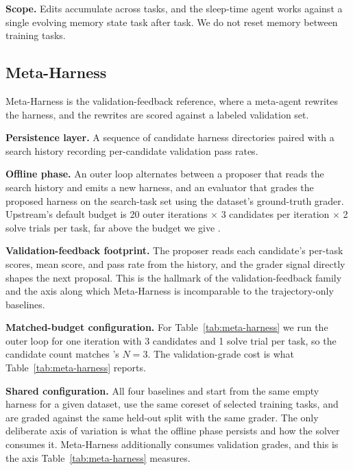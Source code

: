 \noindent\textbf{Scope.}
Edits accumulate across tasks, and the sleep-time agent works against a single evolving memory state task after task.
We do not reset memory between training tasks.

\subsection{Meta-Harness \citep{lee2026metaharness}}

Meta-Harness is the validation-feedback reference, where a meta-agent rewrites the harness, and the rewrites are scored against a labeled validation set.

\noindent\textbf{Persistence layer.}
A sequence of candidate harness directories paired with a search history recording per-candidate validation pass rates.

\noindent\textbf{Offline phase.}
An outer loop alternates between a proposer that reads the search history and emits a new harness, and an evaluator that grades the proposed harness on the search-task set using the dataset's ground-truth grader.
Upstream's default budget is 20 outer iterations $\times$ 3 candidates per iteration $\times$ 2 solve trials per task, far above the budget we give \method{}.

\noindent\textbf{Validation-feedback footprint.}
The proposer reads each candidate's per-task scores, mean score, and pass rate from the history, and the grader signal directly shapes the next proposal.
This is the hallmark of the validation-feedback family and the axis along which Meta-Harness is incomparable to the trajectory-only baselines.

\noindent\textbf{Matched-budget configuration.}
For Table~\ref{tab:meta-harness} we run the outer loop for one iteration with 3 candidates and 1 solve trial per task, so the candidate count matches \method{}'s $N=3$.
The validation-grade cost is what Table~\ref{tab:meta-harness} reports.

\noindent\textbf{Shared configuration.}
All four baselines and \method{} start from the same empty harness for a given dataset, use the same coreset of selected training tasks, and are graded against the same held-out split with the same grader.
The only deliberate axis of variation is what the offline phase persists and how the solver consumes it.
Meta-Harness additionally consumes validation grades, and this is the axis Table~\ref{tab:meta-harness} measures.
